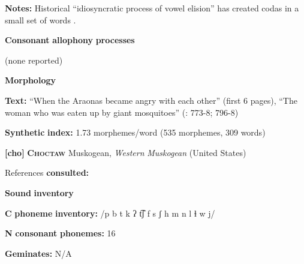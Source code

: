 \documentclass[output=paper]{langsci/langscibook}
\begin{document}
\begin{styleBody}
\textbf{Notes:} Historical “idiosyncratic process of vowel elision” has created codas in a small set of words \citep[29]{Guillaume2008}.
\end{styleBody}

\begin{styleBody}
\textbf{Consonant} \textbf{allophony} \textbf{processes}
\end{styleBody}

\begin{styleBody}
(none reported)
\end{styleBody}

\begin{styleBody}
\textbf{Morphology}
\end{styleBody}

\begin{styleBody}
\textbf{Text:} “When the Araonas became angry with each other” (first 6 pages), “The woman who was eaten up by giant mosquitoes” (\citealt{Guillaume2008}: 773-8; 796-8)
\end{styleBody}

\begin{styleBody}
\textbf{Synthetic} \textbf{index:} 1.73 morphemes/word (535 morphemes, 309 words)
\end{styleBody}

\begin{styleBody}
\textbf{[cho]}   \textbf{\textsc{Choctaw}}  Muskogean, \textit{Western} \textit{Muskogean} (United States)
\end{styleBody}

\begin{styleBody}
References \textbf{consulted:} \citet{Broadwell2006}
\end{styleBody}

\begin{styleBody}
\textbf{Sound} \textbf{inventory}
\end{styleBody}

\begin{styleBody}
\textbf{C} \textbf{phoneme} \textbf{inventory:} /p b t k ʔ t͡ʃ f s ʃ h m n l ɬ w j/
\end{styleBody}

\begin{styleBody}
\textbf{N} \textbf{consonant} \textbf{phonemes:} 16
\end{styleBody}

\begin{styleBody}
\textbf{Geminates:} N/A
\end{styleBody}
\end{document}
